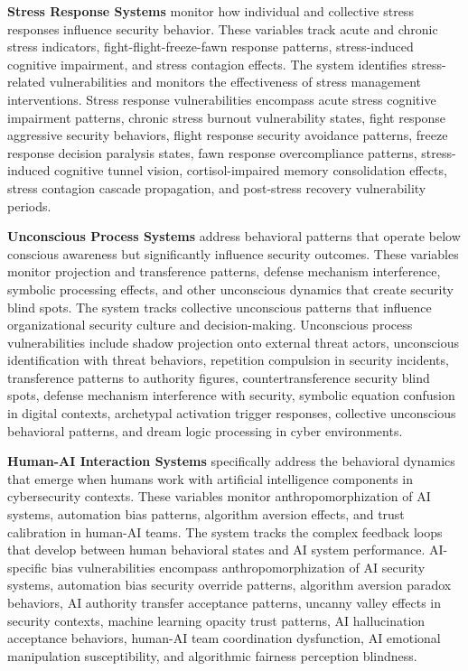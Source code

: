 \documentclass[journal]{IEEEtran}
\begin{document}
\textbf{Stress Response Systems} monitor how individual and collective stress responses influence security behavior. These variables track acute and chronic stress indicators, fight-flight-freeze-fawn response patterns, stress-induced cognitive impairment, and stress contagion effects. The system identifies stress-related vulnerabilities and monitors the effectiveness of stress management interventions. Stress response vulnerabilities encompass acute stress cognitive impairment patterns, chronic stress burnout vulnerability states, fight response aggressive security behaviors, flight response security avoidance patterns, freeze response decision paralysis states, fawn response overcompliance patterns, stress-induced cognitive tunnel vision, cortisol-impaired memory consolidation effects, stress contagion cascade propagation, and post-stress recovery vulnerability periods.

\textbf{Unconscious Process Systems} address behavioral patterns that operate below conscious awareness but significantly influence security outcomes. These variables monitor projection and transference patterns, defense mechanism interference, symbolic processing effects, and other unconscious dynamics that create security blind spots. The system tracks collective unconscious patterns that influence organizational security culture and decision-making. Unconscious process vulnerabilities include shadow projection onto external threat actors, unconscious identification with threat behaviors, repetition compulsion in security incidents, transference patterns to authority figures, countertransference security blind spots, defense mechanism interference with security, symbolic equation confusion in digital contexts, archetypal activation trigger responses, collective unconscious behavioral patterns, and dream logic processing in cyber environments.

\textbf{Human-AI Interaction Systems} specifically address the behavioral dynamics that emerge when humans work with artificial intelligence components in cybersecurity contexts. These variables monitor anthropomorphization of AI systems, automation bias patterns, algorithm aversion effects, and trust calibration in human-AI teams. The system tracks the complex feedback loops that develop between human behavioral states and AI system performance. AI-specific bias vulnerabilities encompass anthropomorphization of AI security systems, automation bias security override patterns, algorithm aversion paradox behaviors, AI authority transfer acceptance patterns, uncanny valley effects in security contexts, machine learning opacity trust patterns, AI hallucination acceptance behaviors, human-AI team coordination dysfunction, AI emotional manipulation susceptibility, and algorithmic fairness perception blindness.
\end{document}
